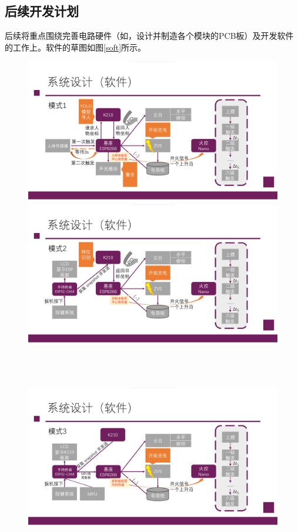 \documentclass{article}
\begin{document}
\subsection{后续开发计划}
后续将重点围绕完善电路硬件（如，设计并制造各个模块的PCB板）及开发软件的工作上。软件的草图如图\ref{soft}所示。
\begin{figure}
\centering
\begin{minipage}[b]{.45\linewidth}
    \includegraphics[width=\linewidth]{imgs/soft1.png}
\end{minipage}
\begin{minipage}[b]{.45\linewidth}
    \includegraphics[width=\linewidth]{imgs/soft2.png}
\end{minipage}
\\
\hspace{10pt}
\\
\begin{minipage}[b]{.45\linewidth}
    \includegraphics[width=\linewidth]{imgs/soft3.png}

\end{minipage}
\end{figure}
\end{document}
